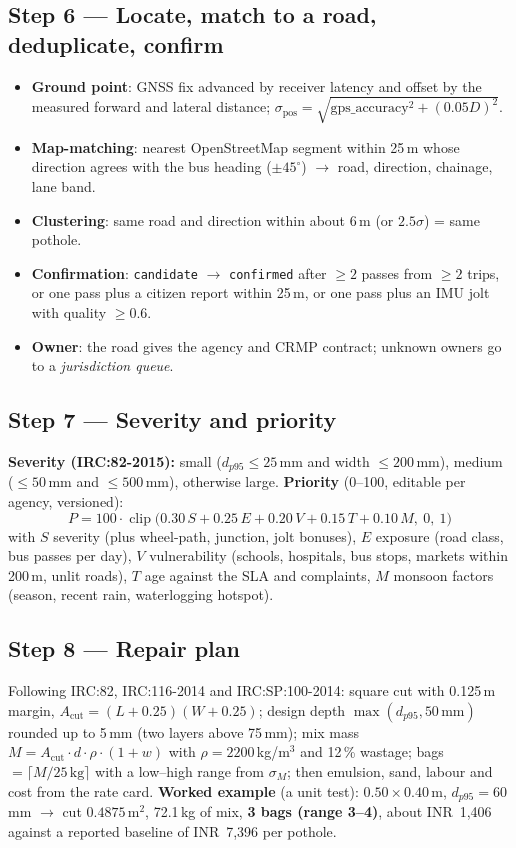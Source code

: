 \documentclass[11pt,a4paper]{article}
\newcommand{\code}[1]{\texttt{\small #1}}
\newcommand{\INR}{INR~}
\begin{document}
\subsection{Step 6 --- Locate, match to a road, deduplicate, confirm}
\begin{itemize}
  \item \textbf{Ground point}: GNSS fix advanced by receiver latency and offset by the measured forward and lateral
        distance; $\sigma_{\text{pos}}=\sqrt{\text{gps\_accuracy}^2+(0.05D)^2}$.
  \item \textbf{Map-matching}: nearest OpenStreetMap segment within 25\,m whose direction agrees with the bus heading
        ($\pm45^\circ$) $\rightarrow$ road, direction, chainage, lane band.
  \item \textbf{Clustering}: same road and direction within about 6\,m (or $2.5\sigma$) = same pothole.
  \item \textbf{Confirmation}: \code{candidate} $\rightarrow$ \code{confirmed} after $\ge2$ passes from $\ge2$ trips,
        or one pass plus a citizen report within 25\,m, or one pass plus an IMU jolt with quality $\ge0.6$.
  \item \textbf{Owner}: the road gives the agency and CRMP contract; unknown owners go to a \emph{jurisdiction queue}.
\end{itemize}

\subsection{Step 7 --- Severity and priority}
\textbf{Severity (IRC:82-2015):} small ($d_{p95}\le25$\,mm and width $\le200$\,mm), medium ($\le50$\,mm and
$\le500$\,mm), otherwise large. \textbf{Priority} (0--100, editable per agency, versioned):
\[ P = 100\cdot\operatorname{clip}\big(0.30\,S+0.25\,E+0.20\,V+0.15\,T+0.10\,M,\ 0,\ 1\big) \]
with $S$ severity (plus wheel-path, junction, jolt bonuses), $E$ exposure (road class, bus passes per day), $V$
vulnerability (schools, hospitals, bus stops, markets within 200\,m, unlit roads), $T$ age against the SLA and
complaints, $M$ monsoon factors (season, recent rain, waterlogging hotspot).

\subsection{Step 8 --- Repair plan}
Following IRC:82, IRC:116-2014 and IRC:SP:100-2014: square cut with 0.125\,m margin, $A_{\text{cut}}=(L+0.25)(W+0.25)$;
design depth $\max(d_{p95},50\,\text{mm})$ rounded up to 5\,mm (two layers above 75\,mm); mix mass
$M=A_{\text{cut}}\cdot d\cdot\rho\cdot(1+w)$ with $\rho=2200$\,kg/m$^3$ and 12\,\% wastage; bags
$=\lceil M/25\,\text{kg}\rceil$ with a low--high range from $\sigma_M$; then emulsion, sand, labour and cost from the
rate card. \textbf{Worked example} (a unit test): $0.50\times0.40$\,m, $d_{p95}=60$\,mm $\rightarrow$ cut
$0.4875$\,m$^2$, 72.1\,kg of mix, \textbf{3 bags (range 3--4)}, about \INR1,406 against a reported baseline of
\INR7,396 per pothole.
\end{document}
